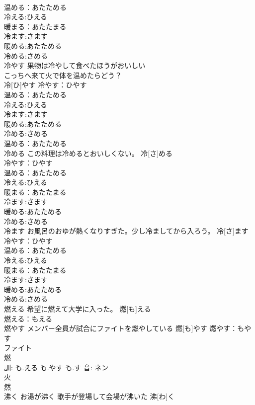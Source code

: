\documentclass[8pt]{extreport}
\begin{document}
\begin{CJK}{UTF8}{min}
\\	温める：あたためる
\\	冷える:ひえる
\\	暖まる：あたたまる
\\	冷ます:さます
\\	暖める:あたためる
\\	冷める:さめる
\\	冷やす	果物は冷やして食べたほうがおいしい 
\\	こっちへ来て火で体を温めたらどう？ 
\\	冷[ひ]やす			冷やす：ひやす
\\	温める：あたためる
\\	冷える:ひえる
\\	冷ます:さます
\\	暖める:あたためる
\\	冷める:さめる
\\	温める：あたためる
\\	冷める	この料理は冷めるとおいしくない。	冷[さ]める	
\\	冷やす：ひやす
\\	温める：あたためる
\\	冷える:ひえる
\\	暖まる：あたたまる
\\	冷ます:さます
\\	暖める:あたためる
\\	冷める:さめる
\\	冷ます	お風呂のおゆが熱くなりすぎた。少し冷ましてから入ろう。	冷[さ]ます	
\\	冷やす：ひやす
\\	温める：あたためる
\\	冷える:ひえる
\\	暖まる：あたたまる
\\	冷ます:さます
\\	暖める:あたためる
\\	冷める:さめる
\\	燃える	希望に燃えて大学に入った。	燃[も]える	
\\	燃える：もえる
\\	燃やす	メンバー全員が試合にファイトを燃やしている	燃[も]やす			燃やす：もやす
\\	ファイト
\\	燃 
\\	訓: も.える も.やす も.す 音: ネン 
\\	火 
\\	然 
\\	沸く	お湯が沸く 歌手が登場して会場が沸いた	沸[わ]く	

\end{CJK}
\end{document}
